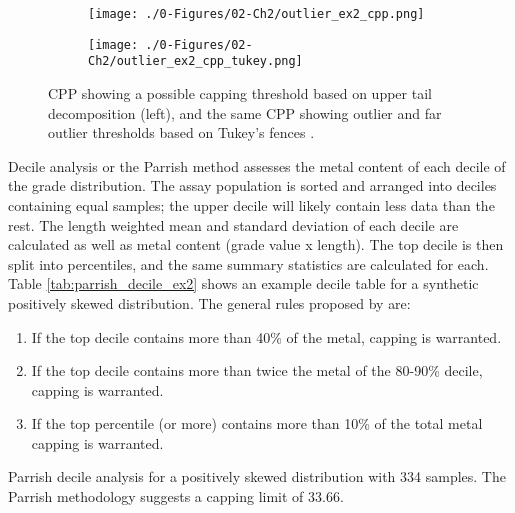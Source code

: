 \begin{figure}[!htb]
    \begin{subfigure}{0.5\textwidth}
        \centering
        \texttt{[image: ./0-Figures/02-Ch2/outlier\_ex2\_cpp.png]}
    \end{subfigure}
    \begin{subfigure}{0.5\textwidth}
        \centering
        \texttt{[image: ./0-Figures/02-Ch2/outlier\_ex2\_cpp\_tukey.png]}
    \end{subfigure}
    \caption{\gls{CPP} showing a possible capping threshold based on upper tail decomposition (left), and the same \gls{CPP} showing outlier and far outlier thresholds based on Tukey's fences \citep{tukey1977exploratory}.}
    \label{fig:cpp}
\end{figure}

Decile analysis or the Parrish method \citep{parrish1997geologist} assesses the metal content of each decile of the grade distribution. The assay population is sorted and arranged into deciles containing equal samples; the upper decile will likely contain less data than the rest. The length weighted mean and standard deviation of each decile are calculated as well as metal content (grade value x length). The top decile is then split into percentiles, and the same summary statistics are calculated for each. Table \ref{tab:parrish_decile_ex2} shows an example decile table for a synthetic positively skewed distribution. The general rules proposed by \cite{parrish1997geologist} are:
\begin{enumerate}[noitemsep]
    \item If the top decile contains more than 40\% of the metal, capping is warranted.
    \item If the top decile contains more than twice the metal of the 80-90\% decile, capping is warranted.
    \item If the top percentile (or more) contains more than 10\% of the total metal capping is warranted.
\end{enumerate}

\begin{table}[!htb]
    \centering
    \caption{Parrish decile analysis for a positively skewed distribution with 334 samples. The Parrish methodology suggests a capping limit of 33.66.}
    \resizebox{1\width}{!}{}
    \label{tab:parrish_decile_ex2}
\end{table}

